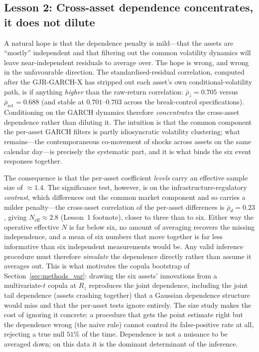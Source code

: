 \documentclass[pdflatex,sn-mathphys-num]{sn-jnl}
\theoremstyle{thmstyleone}
\theoremstyle{thmstyletwo}
\theoremstyle{thmstylethree}
\begin{document}
\subsection{Lesson 2: Cross-asset dependence concentrates, it does not dilute}\label{sec:lesson2}

A natural hope is that the dependence penalty is mild---that the assets are ``mostly'' independent and that filtering out the common volatility dynamics will leave near-independent residuals to average over. The hope is wrong, and wrong in the unfavourable direction. The standardised-residual correlation, computed after the GJR-GARCH-X has stripped out each asset's own conditional-volatility path, is if anything \emph{higher} than the raw-return correlation: $\bar\rho_z=0.705$ versus $\bar\rho_{\text{ret}}=0.688$ (and stable at $0.701$--$0.703$ across the break-control specifications). Conditioning on the GARCH dynamics therefore \emph{concentrates} the cross-asset dependence rather than diluting it. The intuition is that the common component the per-asset GARCH filters is partly idiosyncratic volatility clustering; what remains---the contemporaneous co-movement of shocks across assets on the same calendar day---is precisely the systematic part, and it is what binds the six event responses together.

The consequence is that the per-asset coefficient \emph{levels} carry an effective sample size of $\approx 1.4$. The significance test, however, is on the infrastructure-regulatory \emph{contrast}, which differences out the common market component and so carries a milder penalty---the cross-asset correlation of the per-asset differences is $\bar\rho_d=0.23$, giving $N_{\text{eff}}\approx 2.8$ (Lesson~1 footnote), closer to three than to six. Either way the operative effective $N$ is far below six, no amount of averaging recovers the missing independence, and a mean of six numbers that move together is far less informative than six independent measurements would be. Any valid inference procedure must therefore \emph{simulate} the dependence directly rather than assume it averages out. This is what motivates the copula bootstrap of Section~\ref{sec:methods_var}: drawing the six assets' innovations from a multivariate-$t$ copula at $R_z$ reproduces the joint dependence, including the joint tail dependence (assets crashing together) that a Gaussian dependence structure would miss and that the per-asset tests ignore entirely. The size study makes the cost of ignoring it concrete: a procedure that gets the point estimate right but the dependence wrong (the naive rule) cannot control its false-positive rate at all, rejecting a true null $51\%$ of the time. Dependence is not a nuisance to be averaged down; on this data it is the dominant determinant of the inference.
\end{document}
